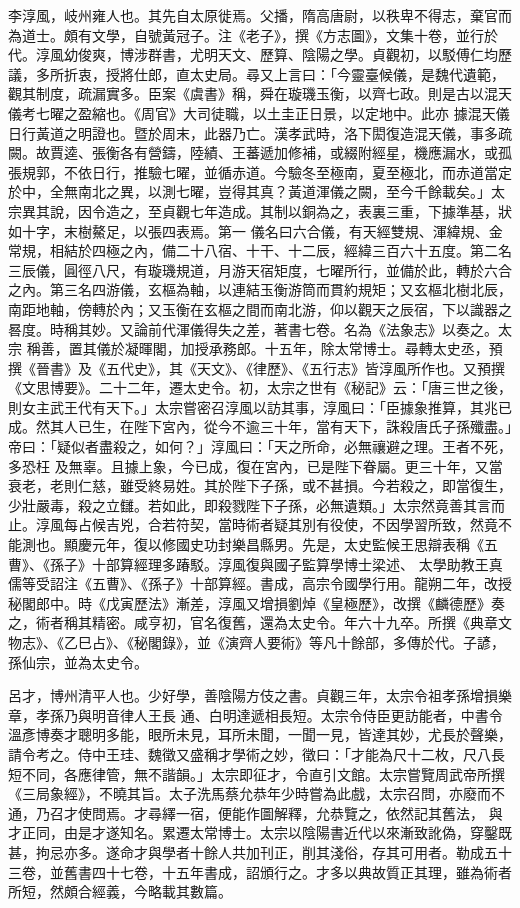 \begin{pinyinscope}
 李淳風，岐州雍人也。其先自太原徙焉。父播，隋高唐尉，以秩卑不得志，棄官而為道士。頗有文學，自號黃冠子。注《老子》，撰《方志圖》，文集十卷，並行於代。淳風幼俊爽，博涉群書，尤明天文、歷算、陰陽之學。貞觀初，以駁傅仁均歷議，多所折衷，授將仕郎，直太史局。尋又上言曰：「今靈臺候儀，是魏代遺範，觀其制度，疏漏實多。臣案《虞書》稱，舜在璇璣玉衡，以齊七政。則是古以混天儀考七曜之盈縮也。《周官》大司徒職，以土圭正日景，以定地中。此亦
 據混天儀日行黃道之明證也。暨於周末，此器乃亡。漢孝武時，洛下閎復造混天儀，事多疏闕。故賈逵、張衡各有營鑄，陸績、王蕃遞加修補，或綴附經星，機應漏水，或孤張規郭，不依日行，推驗七曜，並循赤道。今驗冬至極南，夏至極北，而赤道當定於中，全無南北之異，以測七曜，豈得其真？黃道渾儀之闕，至今千餘載矣。」太宗異其說，因令造之，至貞觀七年造成。其制以銅為之，表裏三重，下據準基，狀如十字，末樹鰲足，以張四表焉。第一
 儀名曰六合儀，有天經雙規、渾緯規、金常規，相結於四極之內，備二十八宿、十干、十二辰，經緯三百六十五度。第二名三辰儀，圓徑八尺，有璇璣規道，月游天宿矩度，七曜所行，並備於此，轉於六合之內。第三名四游儀，玄樞為軸，以連結玉衡游筒而貫約規矩；又玄樞北樹北辰，南距地軸，傍轉於內；又玉衡在玄樞之間而南北游，仰以觀天之辰宿，下以識器之晷度。時稱其妙。又論前代渾儀得失之差，著書七卷。名為《法象志》以奏之。太宗
 稱善，置其儀於凝暉閣，加授承務郎。十五年，除太常博士。尋轉太史丞，預撰《晉書》及《五代史》，其《天文》、《律歷》、《五行志》皆淳風所作也。又預撰《文思博要》。二十二年，遷太史令。初，太宗之世有《秘記》云：「唐三世之後，則女主武王代有天下。」太宗嘗密召淳風以訪其事，淳風曰：「臣據象推算，其兆已成。然其人已生，在陛下宮內，從今不逾三十年，當有天下，誅殺唐氏子孫殲盡。」帝曰：「疑似者盡殺之，如何？」淳風曰：「天之所命，必無禳避之理。王者不死，多恐枉
 及無辜。且據上象，今已成，復在宮內，已是陛下眷屬。更三十年，又當衰老，老則仁慈，雖受終易姓。其於陛下子孫，或不甚損。今若殺之，即當復生，少壯嚴毒，殺之立讎。若如此，即殺戮陛下子孫，必無遺類。」太宗然竟善其言而止。淳風每占候吉兇，合若符契，當時術者疑其別有役使，不因學習所致，然竟不能測也。顯慶元年，復以修國史功封樂昌縣男。先是，太史監候王思辯表稱《五曹》、《孫子》十部算經理多踳駁。淳風復與國子監算學博士梁述、
 太學助教王真儒等受詔注《五曹》、《孫子》十部算經。書成，高宗令國學行用。龍朔二年，改授秘閣郎中。時《戊寅歷法》漸差，淳風又增損劉焯《皇極歷》，改撰《麟德歷》奏之，術者稱其精密。咸亨初，官名復舊，還為太史令。年六十九卒。所撰《典章文物志》、《乙巳占》、《秘閣錄》，並《演齊人要術》等凡十餘部，多傳於代。子諺，孫仙宗，並為太史令。



 呂才，博州清平人也。少好學，善陰陽方伎之書。貞觀三年，太宗令祖孝孫增損樂章，孝孫乃與明音律人王長
 通、白明達遞相長短。太宗令侍臣更訪能者，中書令溫彥博奏才聰明多能，眼所未見，耳所未聞，一聞一見，皆達其妙，尤長於聲樂，請令考之。侍中王珪、魏徵又盛稱才學術之妙，徵曰：「才能為尺十二枚，尺八長短不同，各應律管，無不諧韻。」太宗即征才，令直引文館。太宗嘗覽周武帝所撰《三局象經》，不曉其旨。太子洗馬蔡允恭年少時嘗為此戲，太宗召問，亦廢而不通，乃召才使問焉。才尋繹一宿，便能作圖解釋，允恭覽之，依然記其舊法，
 與才正同，由是才遂知名。累遷太常博士。太宗以陰陽書近代以來漸致訛偽，穿鑿既甚，拘忌亦多。遂命才與學者十餘人共加刊正，削其淺俗，存其可用者。勒成五十三卷，並舊書四十七卷，十五年書成，詔頒行之。才多以典故質正其理，雖為術者所短，然頗合經義，今略載其數篇。




\end{pinyinscope}
